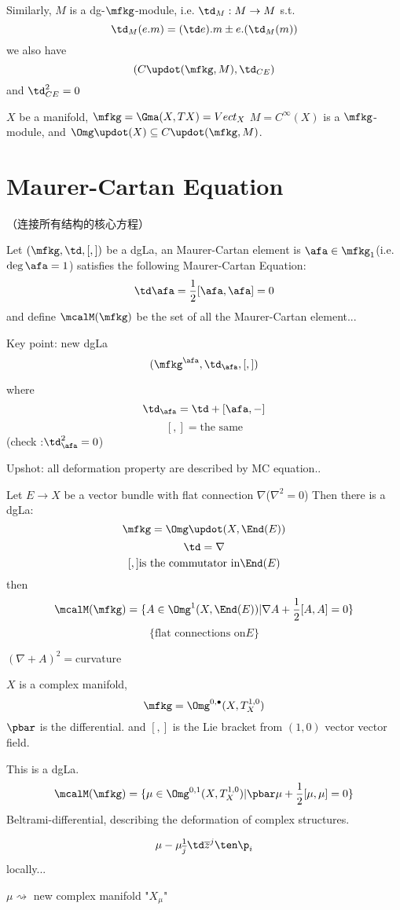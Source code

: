 Similarly, $M$ is a dg-$\mfkg$-module, i.e. 
$\td_M:M\to M$ s.t.
$$\td_M(e.m)=(\td e).m\pm e.(\td_M (m))$$
we also have 
$$(C\updot(\mfkg,M),\td_{CE})$$
and $\td_{CE}^2=0$

\begin{example}
$X$ be a manifold, $\mfkg=\Gma(X,TX)=Vect_X$
$M=C^\infty(X)$ is a $\mfkg$-module, and 
$\Omg\updot(X)\subseteq C\updot(\mfkg,M)$.
\end{example}

\section{Maurer-Cartan Equation}
（连接所有结构的核心方程）

Let $(\mfkg,\td,[,])$ be a dgLa, an 
Maurer-Cartan element is  $\afa\in\mfkg_1$(i.e. $\deg\afa=1$)
satisfies the following Maurer-Cartan Equation:
$$\td\afa=\frac{1}{2}[\afa,\afa]=0$$
and define $\mcalM(\mfkg)$ be the set of all the Maurer-Cartan element...

Key point: new dgLa
$$(\mfkg^\afa,\td_\afa,[,])$$

where 
$$\td_{\afa}=\td+[\afa,-]$$
$$[,]=\text{the same}$$
(check :$\td_\afa^2=0$)

Upshot: all deformation property are described by MC equation..

\begin{example}
Let $E\to X$ be a vector bundle with flat connection $\nabla$($\nabla^2=0$)
Then there is a dgLa:
$$\mfkg=\Omg\updot(X,\End(E))$$
$$\td=\nabla$$
$$[,]\text{is the commutator in}\End(E)$$
then
$$\mcalM(\mfkg)=\{A\in\Omg^1(X,\End(E))|\nabla A+\frac{1}{2}[A,A]=0\}$$
$$\{\text{flat connections on} E\}$$

$(\nabla+A)^2=$curvature
\end{example}

\begin{example}
$X$ is a complex manifold, 
$$\mfkg=\Omg^{0,\bullet}(X,T_X^{1,0})$$
$\pbar$ is the differential. and  
$[,]$ is the Lie bracket from $(1,0)$ vector vector field.

This is a dgLa.
$$\mcalM(\mfkg)=
\{\mu\in\Omg^{0,1}(X,T_X^{1,0})|
\pbar\mu+\frac{1}{2}[\mu,\mu]=0
\}$$
Beltrami-differential, describing the deformation of complex structures.
\end{example}

$$\mu-\mu^1_{\overline{j}}\td\overline{z}^j\ten\p_i$$
locally...

$\mu\rightsquigarrow$ new complex manifold "$X_\mu$"

